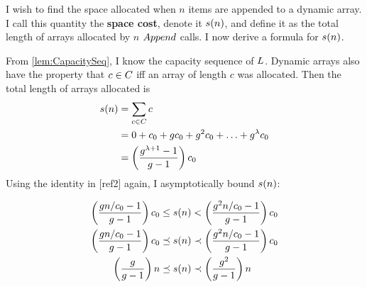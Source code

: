 I wish to find the space allocated when $n$ items are appended to a dynamic array. I call this quantity the \textbf{space cost}, denote it $s(n)$, and define it as the total length of arrays allocated by $n$ $Append$ calls. I now derive a formula for $s(n)$.

From \ref{lem:CapacitySeq}, I know the capacity sequence of $L$. Dynamic arrays also have the property that $c \in C$ iff an array of length $c$ was allocated. Then the total length of arrays allocated is
\begin{align*}
s(n) &= \sum_{c \in C} c\\
&= 0 + c_0 + gc_0 + g^2c_0 + \ldots + g^\lambda c_0\\
&= \left( \frac{g^{\lambda + 1} - 1}{g - 1} \right) c_0
\end{align*}
Using the identity in [ref2] again, I asymptotically bound $s(n)$:

\begin{align*}
\left( \frac{g{n} / c_0 - 1}{g - 1} \right) c_0 \leq s(n) &< \left( \frac{g^2{n} / c_0 - 1}{g - 1} \right) c_0\\
\left( \frac{g{n} / c_0 - 1}{g - 1} \right) c_0 \preceq s(n) &\prec \left( \frac{g^2{n} / c_0 - 1}{g - 1} \right) c_0\\
\left( \frac{g}{g - 1} \right) n \preceq s(n) &\prec \left( \frac{g^2}{g - 1} \right) n
\end{align*}